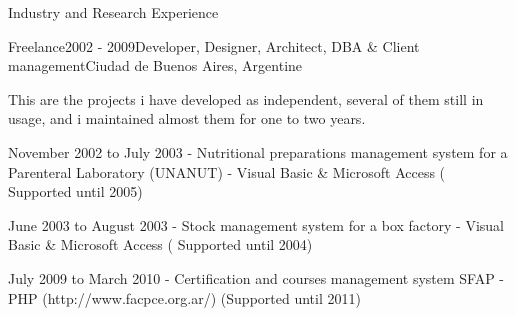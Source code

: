 \documentclass{resume} %
\begin{document}
\begin{rSection}{Industry and Research Experience}
\begin{rSubsection}{Freelance}{2002 - 2009}{Developer, Designer, Architect, DBA \& Client management}{Ciudad de Buenos Aires, Argentine}
\item This are the projects i have developed as independent, several of them still in usage, and i maintained almost them for one to two years. 
\item  November 2002 to July 2003 - Nutritional preparations management system for a Parenteral Laboratory (UNANUT) -  Visual Basic \& Microsoft Access ( Supported until 2005) 
\item  June 2003 to August 2003 - Stock management system for a box factory  - Visual Basic \& Microsoft Access ( Supported until 2004) 
\item  July 2009 to March 2010 - Certification and courses management system SFAP -  PHP (http://www.facpce.org.ar/)  (Supported until 2011)
\end{rSubsection}



\end{rSection}
\end{document}
